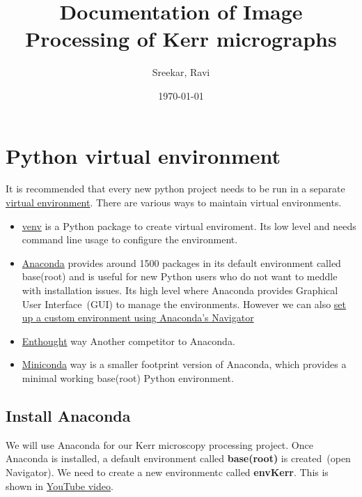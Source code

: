 \documentclass[12pt, twoside, a4paper]{article}
\title{Documentation of Image Processing of Kerr micrographs}
\author{Sreekar, Ravi}
\date{\today}
\begin{document}
%
\maketitle
\cleardoublepage
\tableofcontents
\cleardoublepage
\section{Python virtual environment}
It is recommended that every new python project needs to be run in a separate \href{https://docs.python.org/3/tutorial/venv.html#creating-virtual-environments}{virtual environment}. There are various ways to maintain virtual environments. 
\begin{itemize}
	\item \href{https://docs.python.org/3/tutorial/venv.html#creating-virtual-environments}{venv} is a Python package to create virtual enviroment. Its low level and needs command line usage to configure the environment.
	\item \href{https://docs.anaconda.com/anaconda/install/windows/}{Anaconda} provides around 1500 packages in its default environment called base(root) and is useful for new Python users who do not want to meddle with installation issues. Its high level where Anaconda provides Graphical User Interface~(GUI) to manage the environments. However we can also  \href{https://docs.anaconda.com/anaconda/navigator/tutorials/create-python35-environment/?highlight=environment%20create#creating-a-python-3-5-environment-from-anaconda2-or-anaconda3}{set up a custom environment using Anaconda's Navigator}  
	\item \href{https://www.enthought.com/}{Enthought} way Another competitor to Anaconda.
	\item \href{https://docs.conda.io/en/latest/miniconda.html}{Miniconda} way is a smaller footprint version of Anaconda, which provides a minimal working base(root) Python environment. 
\end{itemize}
%
\subsection{Install Anaconda}
We will use Anaconda for our Kerr microscopy processing project. Once Anaconda is installed, a default environment called \textbf{base(root)} is created~(open Navigator). We need to create a new environmentc called \textbf{envKerr}. This is shown in \href{https://www.youtube.com/watch?v=8bzp04TeE3I}{YouTube video}. 
\end{document}
